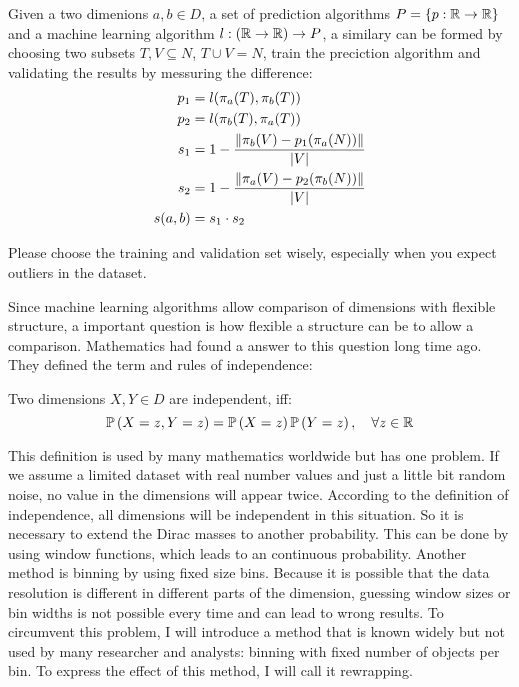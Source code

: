 \begin{envtheo}
	Given a two dimenions $a,b \in D$, a set of prediction algorithms $P = \{ p : \mathbb{R} \rightarrow \mathbb{R} \}$ and a machine learning algorithm $l : (\mathbb{R} \rightarrow \mathbb{R}) \rightarrow P$, a similary can be formed by choosing two subsets $T,V \subseteq N$, $T \cup V = N$, train the preciction algorithm and validating the results by messuring the difference:
	\begin{align}
		p_1 &= l( \pi_a(T), \pi_b(T) )\\
		p_2 &= l( \pi_b(T), \pi_a(T) )\\
		s_1 &= 1 - \frac{\|\pi_b(V) - p_1(\pi_a(N))\|}{\left|V\right|}\\
		s_2 &= 1 - \frac{\|\pi_a(V) - p_2(\pi_b(N))\|}{\left|V\right|}\\
		s(a,b) &= s_1 \cdot s_2
	\end{align}
\end{envtheo}

Please choose the training and validation set wisely, especially when you expect outliers in the dataset.

Since machine learning algorithms allow comparison of dimensions with flexible structure, a important question is how flexible a structure can be to allow a comparison. Mathematics had found a answer to this question long time ago. They defined the term and rules of independence:

\begin{envdef}[Independence]
	Two dimensions $X,Y \in D$ are independent, iff:
	\begin{equation}
		\mathbb{P}\left(X=z,Y=z\right) = \mathbb{P}\left(X=z\right)\mathbb{P}\left(Y=z\right),\quad \forall z \in \mathbb{R}
	\end{equation}
\end{envdef}

This definition is used by many mathematics worldwide but has one problem. If we assume a limited dataset with real number values and just a little bit random noise, no value in the dimensions will appear twice. According to the definition of independence, all dimensions will be independent in this situation. So it is necessary to extend the Dirac masses to another probability. This can be done by using window functions, which leads to an continuous probability. Another method is binning by using fixed size bins. Because it is possible that the data resolution is different in different parts of the dimension, guessing window sizes or bin widths is not possible every time and can lead to wrong results. To circumvent this problem, I will introduce a method that is known widely but not used by many researcher and analysts: binning with fixed number of objects per bin. To express the effect of this method, I will call it rewrapping.


